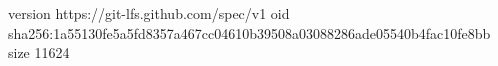 version https://git-lfs.github.com/spec/v1
oid sha256:1a55130fe5a5fd8357a467cc04610b39508a03088286ade05540b4fac10fe8bb
size 11624
